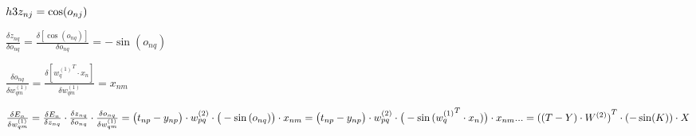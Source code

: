 \documentclass[12pt]{article}
\begin{document}
$
h3 \\
z_{nj} = \cos(o_{nj})
$

$
\frac{\delta z_{nq}}{\delta o_{nq}} = \frac{\delta [\cos(o_{nq})]}{\delta o_{nq}} = -\sin{(o_{nq})}
$

$
\frac{\delta o_{nq}}{\delta w_{qm}^{(1)}} = \frac{\delta [{w_q^{(1)}}^T \cdot x_n]}{\delta w_{qm}^{(1)}} = x_{nm}
$

$
\frac{\delta E_n}{\delta w_{qm}^{(1)}} = \frac{\delta E_n}{\delta z_{nq}} \cdot \frac{\delta z_{nq}}{\delta o_{nq}} \cdot \frac{\delta o_{nq}}{\delta w_{qm}^{(1)}} \\
= \big( t_{np} - y_{np} \big) \cdot w_{pq}^{(2)} \cdot \big(-\sin{(o_{nq})}\big) \cdot x_{nm} \\
= \big( t_{np} - y_{np} \big) \cdot w_{pq}^{(2)} \cdot \big(-\sin{({w_q^{(1)}}^T \cdot x_n)}\big) \cdot x_{nm} \\
... \\
= {((T - Y) \cdot W^{(2)})}^T \cdot (-\sin (K)) \cdot X
$
\end{document}
